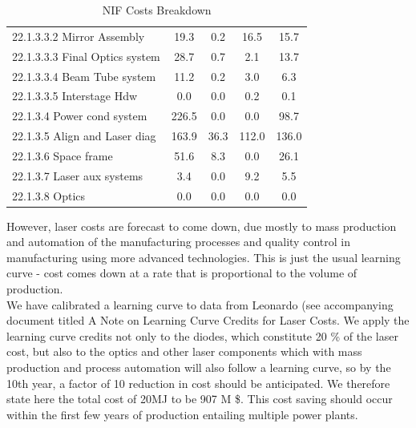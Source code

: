 \begin{table}[h!]
{\begin{tabular}{lcccc}
\hspace{10mm}22.1.3.3.2 Mirror Assembly & 19.3 & 0.2 & 16.5 & 15.7 \\
\hspace{10mm}22.1.3.3.3 Final Optics system & 28.7 & 0.7 & 2.1 & 13.7 \\
\hspace{10mm}22.1.3.3.4 Beam Tube system & 11.2 & 0.2 & 3.0 & 6.3 \\
\hspace{10mm}22.1.3.3.5 Interstage Hdw & 0.0 & 0.0 & 0.2 & 0.1 \\
\hspace{5mm}22.1.3.4 Power cond system & 226.5 & 0.0 & 0.0 & 98.7 \\
\hspace{5mm}22.1.3.5 Align and Laser diag & 163.9 & 36.3 & 112.0 & 136.0 \\
\hspace{5mm}22.1.3.6 Space frame & 51.6 & 8.3 & 0.0 & 26.1 \\
\hspace{5mm}22.1.3.7 Laser aux systems & 3.4 & 0.0 & 9.2 & 5.5 \\
\hspace{5mm}22.1.3.8 Optics & 0.0 & 0.0 & 0.0 & 0.0 \\
\hline
\end{tabular}}
\caption{NIF Costs Breakdown}
\label{tab:nif_costs}
\end{table}

 However, laser costs are forecast to come down, due mostly to mass production and automation of the manufacturing processes and  
 quality control in manufacturing using more advanced technologies.   
 This is just the usual learning curve - cost comes down at a rate that is proportional to the volume of production.  \\ 

 We have calibrated a learning curve to data from Leonardo (see accompanying document titled A Note on Learning Curve Credits for Laser Costs. 
 We apply the learning curve credits not only to the diodes, which constitute 20 \% of the laser cost, but also to the  
 optics and other laser components which with mass production and process automation will also follow a learning curve, so  
 by the 10th year, a factor of 10 reduction in cost should be anticipated.  We therefore state here the total cost of 20MJ  
 to be 907 M \$.  This cost saving should occur within the first few years of production entailing multiple power plants. \\

